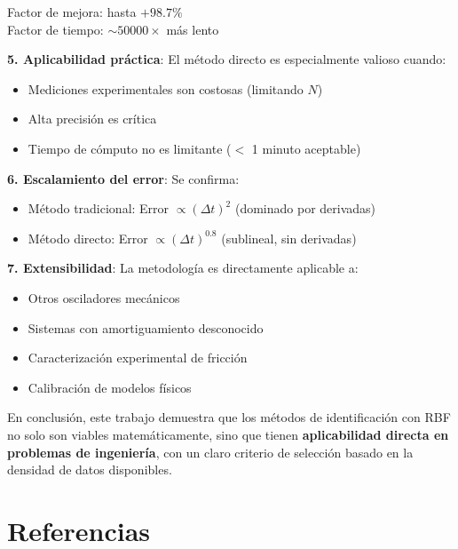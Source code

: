 \documentclass[11pt,a4paper]{article}
\begin{document}
Factor de mejora: hasta $+98.7\%$ \\
Factor de tiempo: $\sim 50000\times$ más lento

\textbf{5. Aplicabilidad práctica}: El método directo es especialmente valioso cuando:
\begin{itemize}
\item Mediciones experimentales son costosas (limitando $N$)
\item Alta precisión es crítica
\item Tiempo de cómputo no es limitante ($<$ 1 minuto aceptable)
\end{itemize}

\textbf{6. Escalamiento del error}: Se confirma:
\begin{itemize}
\item Método tradicional: Error $\propto (\Delta t)^2$ (dominado por derivadas)
\item Método directo: Error $\propto (\Delta t)^{0.8}$ (sublineal, sin derivadas)
\end{itemize}

\textbf{7. Extensibilidad}: La metodología es directamente aplicable a:
\begin{itemize}
\item Otros osciladores mecánicos
\item Sistemas con amortiguamiento desconocido
\item Caracterización experimental de fricción
\item Calibración de modelos físicos
\end{itemize}

En conclusión, este trabajo demuestra que los métodos de identificación con RBF no solo son viables matemáticamente, sino que tienen \textbf{aplicabilidad directa en problemas de ingeniería}, con un claro criterio de selección basado en la densidad de datos disponibles.

\section*{Referencias}
\end{document}
